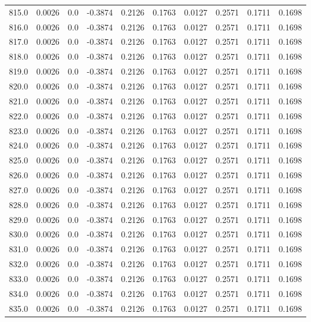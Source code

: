 \begin{longtable}{lrrrrrrrrr}
815.0 & 0.0026 & 0.0 & -0.3874 & 0.2126 & 0.1763 & 0.0127 & 0.2571 & 0.1711 & 0.1698 \\
816.0 & 0.0026 & 0.0 & -0.3874 & 0.2126 & 0.1763 & 0.0127 & 0.2571 & 0.1711 & 0.1698 \\
817.0 & 0.0026 & 0.0 & -0.3874 & 0.2126 & 0.1763 & 0.0127 & 0.2571 & 0.1711 & 0.1698 \\
818.0 & 0.0026 & 0.0 & -0.3874 & 0.2126 & 0.1763 & 0.0127 & 0.2571 & 0.1711 & 0.1698 \\
819.0 & 0.0026 & 0.0 & -0.3874 & 0.2126 & 0.1763 & 0.0127 & 0.2571 & 0.1711 & 0.1698 \\
820.0 & 0.0026 & 0.0 & -0.3874 & 0.2126 & 0.1763 & 0.0127 & 0.2571 & 0.1711 & 0.1698 \\
821.0 & 0.0026 & 0.0 & -0.3874 & 0.2126 & 0.1763 & 0.0127 & 0.2571 & 0.1711 & 0.1698 \\
822.0 & 0.0026 & 0.0 & -0.3874 & 0.2126 & 0.1763 & 0.0127 & 0.2571 & 0.1711 & 0.1698 \\
823.0 & 0.0026 & 0.0 & -0.3874 & 0.2126 & 0.1763 & 0.0127 & 0.2571 & 0.1711 & 0.1698 \\
824.0 & 0.0026 & 0.0 & -0.3874 & 0.2126 & 0.1763 & 0.0127 & 0.2571 & 0.1711 & 0.1698 \\
825.0 & 0.0026 & 0.0 & -0.3874 & 0.2126 & 0.1763 & 0.0127 & 0.2571 & 0.1711 & 0.1698 \\
826.0 & 0.0026 & 0.0 & -0.3874 & 0.2126 & 0.1763 & 0.0127 & 0.2571 & 0.1711 & 0.1698 \\
827.0 & 0.0026 & 0.0 & -0.3874 & 0.2126 & 0.1763 & 0.0127 & 0.2571 & 0.1711 & 0.1698 \\
828.0 & 0.0026 & 0.0 & -0.3874 & 0.2126 & 0.1763 & 0.0127 & 0.2571 & 0.1711 & 0.1698 \\
829.0 & 0.0026 & 0.0 & -0.3874 & 0.2126 & 0.1763 & 0.0127 & 0.2571 & 0.1711 & 0.1698 \\
830.0 & 0.0026 & 0.0 & -0.3874 & 0.2126 & 0.1763 & 0.0127 & 0.2571 & 0.1711 & 0.1698 \\
831.0 & 0.0026 & 0.0 & -0.3874 & 0.2126 & 0.1763 & 0.0127 & 0.2571 & 0.1711 & 0.1698 \\
832.0 & 0.0026 & 0.0 & -0.3874 & 0.2126 & 0.1763 & 0.0127 & 0.2571 & 0.1711 & 0.1698 \\
833.0 & 0.0026 & 0.0 & -0.3874 & 0.2126 & 0.1763 & 0.0127 & 0.2571 & 0.1711 & 0.1698 \\
834.0 & 0.0026 & 0.0 & -0.3874 & 0.2126 & 0.1763 & 0.0127 & 0.2571 & 0.1711 & 0.1698 \\
835.0 & 0.0026 & 0.0 & -0.3874 & 0.2126 & 0.1763 & 0.0127 & 0.2571 & 0.1711 & 0.1698 \\

\end{longtable}
